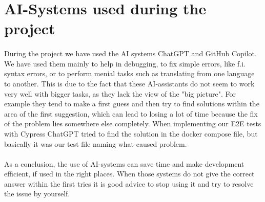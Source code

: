 \section{AI-Systems used during the project}
\paragraph{} During the project we have used the AI systems ChatGPT and GitHub Copilot. We have used them mainly to help in debugging, to fix simple errors, like f.i. syntax errors, or to perform menial tasks such as translating from one language to another. This is due to the fact that these AI-assistants do not seem to work very well with bigger tasks, as they lack the view of the "big picture". For example they tend to make a first guess and then try to find solutions within the area of the first suggestion, which can lead to losing a lot of time because the fix of the problem lies somewhere else completely. When implementing our E2E tests with Cypress ChatGPT tried to find the solution in the docker compose file, but basically it was our test file naming what caused problem.

\paragraph{} As a conclusion, the use of AI-systems can save time and make development efficient, if used in the right places. When those systems do not give the correct answer within the first tries it is good advice to stop using it and try to resolve the issue by yourself. 